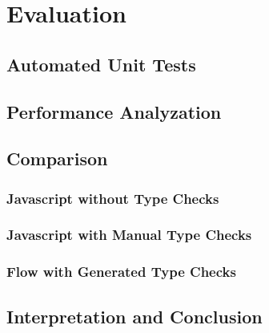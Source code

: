 
\chapter{Evaluation}
\label{cha:evaluation}

\section{Automated Unit Tests}
\label{sec:automated-unit-tests}

\section{Performance Analyzation}
\label{sec:performance-analyzation}

\section{Comparison}
\label{sec:comparison}

\subsection{Javascript without Type Checks}
\label{sec:javascript-without-type-checks}

\subsection{Javascript with Manual Type Checks}
\label{sec:javascript-with-manual-type-checks}

\subsection{Flow with Generated Type Checks}
\label{sec:flow-with-generated-type-checks}

\section{Interpretation and Conclusion}
\label{sec:interpretation-conclusion}
